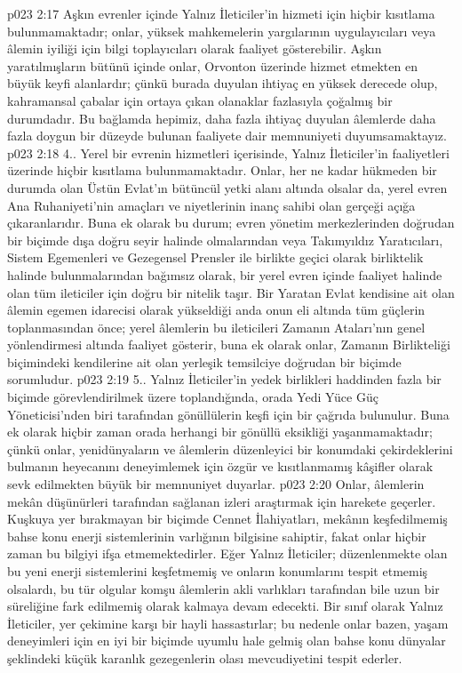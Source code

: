 \vs p023 2:17 Aşkın evrenler içinde Yalnız İleticiler’in hizmeti için hiçbir kısıtlama bulunmamaktadır; onlar, yüksek mahkemelerin yargılarının uygulayıcıları veya âlemin iyiliği için bilgi toplayıcıları olarak faaliyet gösterebilir. Aşkın yaratılmışların bütünü içinde onlar, Orvonton üzerinde hizmet etmekten en büyük keyfi alanlardır; çünkü burada duyulan ihtiyaç en yüksek derecede olup, kahramansal çabalar için ortaya çıkan olanaklar fazlasıyla çoğalmış bir durumdadır. Bu bağlamda hepimiz, daha fazla ihtiyaç duyulan âlemlerde daha fazla doygun bir düzeyde bulunan faaliyete dair memnuniyeti duyumsamaktayız.
\vs p023 2:18 4.\bibnobreakspace {}. Yerel bir evrenin hizmetleri içerisinde, Yalnız İleticiler’in faaliyetleri üzerinde hiçbir kısıtlama bulunmamaktadır. Onlar, her ne kadar hükmeden bir durumda olan Üstün Evlat’ın bütüncül yetki alanı altında olsalar da, yerel evren Ana Ruhaniyeti’nin amaçları ve niyetlerinin inanç sahibi olan gerçeği açığa çıkaranlarıdır. Buna ek olarak bu durum; evren yönetim merkezlerinden doğrudan bir biçimde dışa doğru seyir halinde olmalarından veya Takımyıldız Yaratıcıları, Sistem Egemenleri ve Gezegensel Prensler ile birlikte geçici olarak birliktelik halinde bulunmalarından bağımsız olarak, bir yerel evren içinde faaliyet halinde olan tüm ileticiler için doğru bir nitelik taşır. Bir Yaratan Evlat kendisine ait olan âlemin egemen idarecisi olarak yükseldiği anda onun eli altında tüm güçlerin toplanmasından önce; yerel âlemlerin bu ileticileri Zamanın Ataları’nın genel yönlendirmesi altında faaliyet gösterir, buna ek olarak onlar, Zamanın Birlikteliği biçimindeki kendilerine ait olan yerleşik temsilciye doğrudan bir biçimde sorumludur.
\vs p023 2:19 5.\bibnobreakspace {}. Yalnız İleticiler’in yedek birlikleri haddinden fazla bir biçimde görevlendirilmek üzere toplandığında, orada Yedi Yüce Güç Yöneticisi’nden biri tarafından gönüllülerin keşfi için bir çağrıda bulunulur. Buna ek olarak hiçbir zaman orada herhangi bir gönüllü eksikliği yaşanmamaktadır; çünkü onlar, yenidünyaların ve âlemlerin düzenleyici bir konumdaki çekirdeklerini bulmanın heyecanını deneyimlemek için özgür ve kısıtlanmamış kâşifler olarak sevk edilmekten büyük bir memnuniyet duyarlar.
\vs p023 2:20 Onlar, âlemlerin mekân düşünürleri tarafından sağlanan izleri araştırmak için harekete geçerler. Kuşkuya yer bırakmayan bir biçimde Cennet İlahiyatları, mekânın keşfedilmemiş bahse konu enerji sistemlerinin varlığının bilgisine sahiptir, fakat onlar hiçbir zaman bu bilgiyi ifşa etmemektedirler. Eğer Yalnız İleticiler; düzenlenmekte olan bu yeni enerji sistemlerini keşfetmemiş ve onların konumlarını tespit etmemiş olsalardı, bu tür olgular komşu âlemlerin akli varlıkları tarafından bile uzun bir süreliğine fark edilmemiş olarak kalmaya devam edecekti. Bir sınıf olarak Yalnız İleticiler, yer çekimine karşı bir hayli hassastırlar; bu nedenle onlar bazen, yaşam deneyimleri için en iyi bir biçimde uyumlu hale gelmiş olan bahse konu dünyalar şeklindeki küçük karanlık gezegenlerin olası mevcudiyetini tespit ederler.
